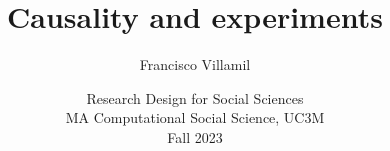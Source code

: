 \documentclass[aspectratio=43]{beamer}
\title[Lecture 3: Causality and experiments]{\Large Causality and experiments}
\author[]{Francisco Villamil}
\date[]{Research Design for Social Sciences\\MA Computational Social Science, UC3M\\Fall 2023}
\begin{document}

\begin{frame}
  \titlepage
\end{frame}


\end{document}
